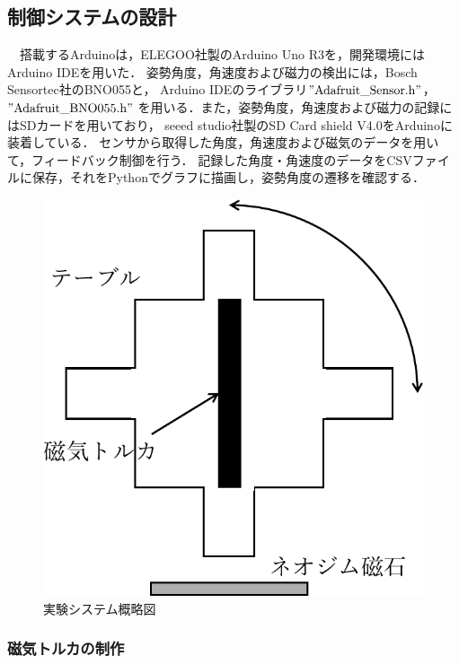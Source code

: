 \subsection{制御システムの設計}

　搭載するArduinoは，ELEGOO社製のArduino Uno R3を，開発環境にはArduino IDEを用いた．
姿勢角度，角速度および磁力の検出には，Bosch Sensortec社のBNO055と，
Arduino IDEのライブラリ$"\mathrm{Adafruit\_Sensor.h}"$，$"\mathrm{Adafruit\_BNO055.h}"$
を用いる．また，姿勢角度，角速度および磁力の記録にはSDカードを用いており，
seeed studio社製のSD Card shield V4.0をArduinoに装着している．
センサから取得した角度，角速度および磁気のデータを用いて，フィードバック制御を行う．
記録した角度・角速度のデータをCSVファイルに保存，それをPythonでグラフに描画し，姿勢角度の遷移を確認する．

\begin{figure}[H]
	\centering
		\includegraphics[scale=0.5]{./figure/system-crop.pdf}
		\caption{実験システム概略図}
		\label{fig:systemfig}
\end{figure}

\subsubsection{磁気トルカの制作}

